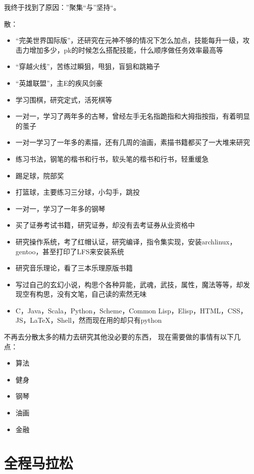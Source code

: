 我终于找到了原因：”聚集“与”坚持“。


散：
\begin{itemize}
\item “完美世界国际版”，还研究在元神不够的情况下怎么加点，技能每升一级，攻击力增加多少，pk的时候怎么搭配技能，什么顺序做任务效率最高等
\item “穿越火线”，苦练过瞬狙，甩狙，盲狙和跳箱子
\item “英雄联盟”，主E的疾风剑豪
\item 学习围棋，研究定式，活死棋等
\item 一对一，学习了两年多的古琴，曾经左手无名指跪指和大拇指按指，有着明显的茧子
\item 一对一学习了一年多的素描，还有几周的油画，素描书籍都买了一大堆来研究
\item 练习书法，钢笔的楷书和行书，软头笔的楷书和行书，轻重缓急
\item 踢足球，院部奖
\item 打篮球，主要练习三分球，小勾手，跳投
\item 一对一，学习了一年多的钢琴
\item 买了证券考试书籍，研究证券，却没有去考证券从业资格中
\item 研究操作系统，考了红帽认证，研究编译，指令集实现，安装archlinux，gentoo，甚至打印了LFS来安装系统
\item 研究音乐理论，看了三本乐理原版书籍
\item 写过自己的玄幻小说，构思个各种异能，武魂，武技，属性，魔法等等，却发现空有构思，没有文笔，自己读的索然无味
\item C，Java，Scala，Python，Scheme，Common Lisp，Elisp，HTML，CSS，JS，LaTeX，Shell，然而现在用的却只有python
\end{itemize}



不再去分散太多的精力去研究其他没必要的东西，
现在需要做的事情有以下几点：
\begin{itemize}
\item 算法
\item 健身
\item 钢琴
\item 油画
\item 金融
\end{itemize}



\section{全程马拉松}

